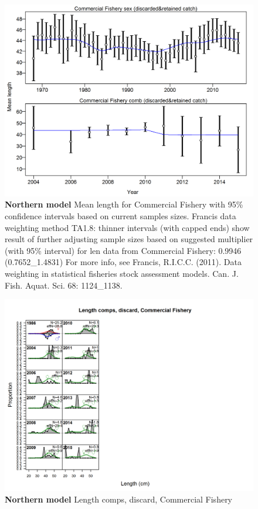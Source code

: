 \documentclass[12pt,]{article}
\begin{document}
\begin{figure}[htbp]
\centering
\includegraphics{./tex2pdf.8516/134fba6e611f1b7b471828c86599d6b35bfa09c1.png}
\caption{\textbf{Northern model} Mean length for Commercial Fishery with
95\% confidence intervals based on current samples sizes. Francis data
weighting method TA1.8: thinner intervals (with capped ends) show result
of further adjusting sample sizes based on suggested multiplier (with
95\% interval) for len data from Commercial Fishery: 0.9946
(0.7652\_1.4831) For more info, see Francis, R.I.C.C. (2011). Data
weighting in statistical fisheries stock assessment models. Can. J.
Fish. Aquat. Sci. 68: 1124\_1138.
\label{fig:mod1_5_comp_lenfit_data_weighting_TA1.8_Commercial Fishery}}
\end{figure}

\begin{figure}[htbp]
\centering
\includegraphics{./r4ss/plots_mod1/comp_lenfit_flt1mkt1.png}
\caption{\textbf{Northern model} Length comps, discard, Commercial
Fishery \label{fig:mod1_6_comp_lenfit_flt1mkt1}}
\end{figure}
\end{document}
